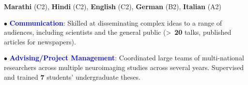 \documentclass[10pt]{article}
\begin{document}
	\textbf{Marathi} (C2), \textbf{Hindi} (C2), \textbf{English} (C2), \textbf{German} (B2), \textbf{Italian} (A2)
	
	
	$\bullet$ \textcolor{blue}{\textbf{Communication}}: Skilled	at	disseminating complex ideas to a range of audiences, including scientists and \hspace*{0.1in}the general public (\textgreater ~\textbf{20} talks, published articles for newspapers).	
	\miniskip
	
	$\bullet$ \textcolor{blue}{\textbf{Advising/Project Management}}: Coordinated large teams of multi-national researchers across multiple \hspace*{0.1in}neuroimaging studies across several years. Supervised and trained \textbf{7} students' undergraduate theses.
	
	
\end{document}
